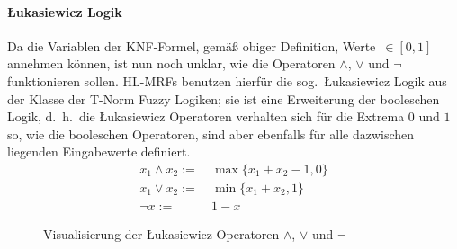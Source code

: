 \paragraph{Łukasiewicz Logik}
Da die Variablen der KNF-Formel, gemäß obiger Definition, Werte~$\in [0, 1]$ annehmen können, ist nun noch unklar, wie die Operatoren $\land$, $\lor$ und $\lnot$ funktionieren sollen.
HL-MRFs benutzen hierfür die sog.\ Łukasiewicz Logik aus der Klasse der T-Norm Fuzzy Logiken;
sie ist eine Erweiterung der booleschen Logik, d.~h.\ die Łukasiewicz Operatoren verhalten sich für die Extrema $0$ und $1$ so, wie die booleschen Operatoren, sind aber ebenfalls für alle dazwischen liegenden Eingabewerte definiert.
\begin{align}
	x_1 \land x_2 :=&\ \max\{ x_1 + x_2 - 1, 0 \} \\ %
	x_1 \lor x_2 :=&\ \min\{ x_1 + x_2, 1 \} \\ %
	\lnot x :=&\ 1 - x
\end{align}
\begin{figure}[h]
	\centering
	\caption{Visualisierung der Łukasiewicz Operatoren $\land$, $\lor$ und $\lnot$}\label{fig:theory:luklogic}
\end{figure} \\
